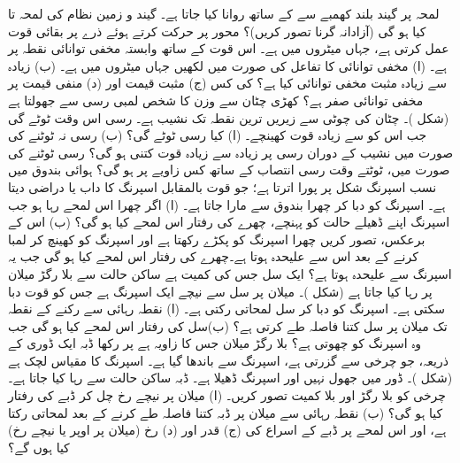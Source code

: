 لمحہ  پر   گیند     بلند  کھمبے   سے  کے ساتھ روانا کیا جاتا ہے۔  گیند و زمین نظام کی  لمحہ  تا   کیا ہو گی (آزادانہ گرنا تصور کریں)؟
محور  پر حرکت کرتے ہوئے  ذرے پر بقائی قوت  عمل   کرتی ہے، جہاں  میٹروں میں ہے۔ اس قوت کے ساتھ  وابستہ مخفی توانائی  نقطہ  پر  ہے۔ (ا)  مخفی توانائی  کا تفاعل  کی صورت میں لکھیں جہاں   میٹروں میں ہے۔ (ب)  زیادہ سے زیادہ مثبت مخفی توانائی کیا ہے؟   کی  کس (ج) مثبت قیمت اور (د) منفی قیمت پر مخفی توانائی صفر ہے؟
کھڑی چٹان سے    وزن کا شخص   لمبی رسی  سے جھولتا ہے (شکل )۔  چٹان کی چوٹی سے     زیریں ترین نقطہ تک نشیب    ہے۔ رسی اس وقت ٹوٹے  گی جب اس  کو    سے زیادہ قوت  کھینچے۔ (ا) کیا رسی ٹوٹے گی؟ (ب)  رسی نہ ٹوٹنے کی صورت میں نشیب کے دوران رسی پر زیادہ سے زیادہ قوت کتنی ہو گی؟  رسی ٹوٹنے کی صورت میں، ٹوٹتے وقت رسی انتصاب کے ساتھ کس زاویے پر ہو گی؟
ہوائی بندوق میں  نسب اسپرنگ شکل  پر پورا  اترتا ہے؛ جو قوت بالمقابل اسپرنگ کا داب یا   دراضی   دیتا ہے۔ اسپرنگ کو  دبا کر  چھرا بندوق سے  مارا جاتا ہے۔ (ا)  اگر   چھرا اس  لمحے   رہا  ہو جب اسپرنگ اپنے ڈھیلے  حالت کو پہنچے، چھرے کی رفتار اس  لمحے کیا ہو گی؟ (ب)  اس کے برعکس،  تصور کریں چھرا  اسپرنگ  کو پکڑے رکھتا ہے اور    اسپرنگ  کو  کھینچ کر    لمبا کرنے کے بعد اس سے علیحدہ ہوتا ہے۔چھرے کی رفتار اس لمحے کیا ہو گی جب یہ اسپرنگ سے علیحدہ ہوتا ہے؟
ایک سل جس کی کمیت  ہے ساکن حالت سے  بلا رگڑ  میلان پر رہا کیا جاتا ہے (شکل )۔ میلان پر سل سے نیچے  ایک اسپرنگ ہے جس کو  قوت  دبا سکتی ہے۔ اسپرنگ کو  دبا کر سل لمحاتی رکتی ہے۔ (ا)    نقطہ رہائی سے رکنے کے نقطہ تک میلان پر سل کتنا فاصلہ طے کرتی ہے؟ (ب)سل کی رفتار اس لمحے کیا ہو گی جب وہ   اسپرنگ کو چھوتی ہے؟
بلا رگڑ میلان جس کا  زاویہ  ہے پر  رکھا  ڈبہ    ایک ڈوری کے ذریعہ،  جو چرخی سے گزرتی ہے،   اسپرنگ سے باندھا گیا ہے۔ اسپرنگ کا مقیاس لچک  ہے (شکل )۔   ڈور  میں جھول  نہیں  اور  اسپرنگ  ڈھیلا ہے۔ ڈبہ ساکن حالت سے رہا کیا جاتا ہے۔ چرخی کو بلا رگڑ اور بلا کمیت تصور کریں۔ (ا)  میلان پر   نیچے  رخ چل کر ڈبے کی رفتار کیا ہو گی؟ (ب) نقطہ رہائی سے میلان  پر ڈبہ کتنا فاصلہ طے کرنے کے بعد لمحاتی رکتا ہے، اور  اس لمحے  پر ڈبے  کے  اسراع کی (ج)  قدر اور (د) رخ (میلان پر اوپر یا نیچے رخ) کیا ہوں گے؟
